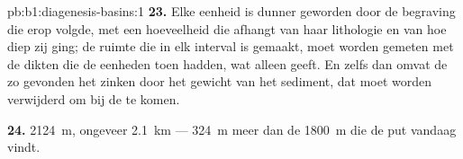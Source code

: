 \begin{solution}{pb:b1:diagenesis-basins:1}
\textbf{23.} Elke eenheid is dunner geworden door de begraving die erop volgde, met een hoeveelheid die
afhangt van haar lithologie en van hoe diep zij ging; de ruimte die in elk interval is gemaakt, moet worden
gemeten met de dikten die de eenheden toen hadden, wat alleen  geeft. En zelfs dan omvat de zo
gevonden  het zinken door het gewicht van het sediment, dat moet worden verwijderd om bij de
 te komen.

\textbf{24.} \qty{2124}{m}, ongeveer \qty{2.1}{km} --- \qty{324}{m} meer dan de \qty{1800}{m} die de put vandaag vindt.
\end{solution}
